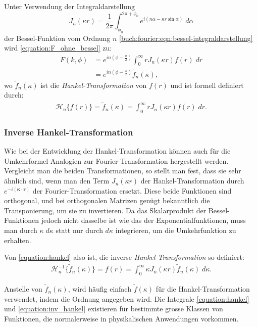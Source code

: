 Unter Verwendung der Integraldarstellung
\begin{equation*}
	J_n(\kappa r)=\frac{1}{2\pi}\int_{\phi_{0}}^{2\pi + \phi_{0}}e^{i(n\alpha-\kappa r \sin \alpha)} \; d\alpha
	\label{equation:bessel_n_ordnung}
\end{equation*}
 der Bessel-Funktion vom Ordnung $n$ \eqref{buch:fourier:eqn:bessel-integraldarstellung} wird \eqref{equation:F_ohne_bessel} zu:
\begin{align}
	F(k,\phi)&=e^{in(\phi-\frac{\pi}{2})}\int_{0}^{\infty}rJ_n(\kappa r) f(r) \; dr  \nonumber \\ 
	&=e^{in(\phi-\frac{\pi}{2})}\tilde{f}_n(\kappa),
	\label{equation:F_mit_bessel_step_2}
\end{align}
wo $\tilde{f}_n(\kappa)$ ist die \textit{Hankel-Transformation} von $f(r)$ und ist formell definiert durch:
\begin{align}
	\mathscr{H}_n\{f(r)\}=\tilde{f}_n(\kappa)=\int_{0}^{\infty}rJ_n(\kappa r) f(r) \; dr.
	\label{equation:hankel}
\end{align}

\subsubsection{Inverse Hankel-Transformation \label{subsub:inverse_hankel_tansformation}}
Wie bei der Entwicklung der Hankel-Transformation können auch für die Umkehrformel Analogien zur Fourier-Transformation hergestellt werden. Vergleicht man die beiden Transformationen, so stellt man fest, dass sie sehr ähnlich sind, wenn man den Term $J_n(\kappa r)$ der Hankel-Transformation durch $e^{-i( \bm{\kappa}\cdot \mathbf{r})}$ der Fourier-Transformation ersetzt. Diese beide Funktionen sind orthogonal, und bei orthogonalen Matrizen genügt bekanntlich die Transponierung, um sie zu invertieren. Da das Skalarprodukt der Bessel-Funktionen jedoch nicht dasselbe ist wie das der Exponentialfunktionen, muss man durch $\kappa\; d\kappa$ statt nur durch $d\kappa$ integrieren, um die Umkehrfunktion zu erhalten.

Von \eqref{equation:hankel} also ist, die inverse \textit{Hankel-Transformation} so definiert:
\begin{align}
	\mathscr{H}^{-1}_n\{\tilde{f}_n(\kappa)\}=f(r)=\int_{0}^{\infty}\kappa J_n(\kappa r) \tilde{f}_n(\kappa) \; d\kappa.
	\label{equation:inv_hankel}
\end{align}

Anstelle von $\tilde{f}_n(\kappa)$, wird häufig einfach $\tilde{f}(\kappa)$ für die Hankel-Transformation verwendet, indem die Ordnung angegeben wird.
Die Integrale \eqref{equation:hankel} und \eqref{equation:inv_hankel} existieren für bestimmte grosse Klassen von Funktionen, die normalerweise in physikalischen Anwendungen vorkommen.

